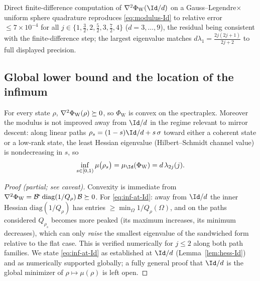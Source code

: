 \begin{remark}
\label{rem:numerics}
Direct finite-difference computation of $\Hess\Phi_{\mathrm W}(\Id/d)$ on a
Gauss--Legendre$\times$uniform sphere quadrature reproduces
\eqref{eq:modulus-Id} to relative error $\le 7\times10^{-4}$ for all
$j\in\{1,\tfrac32,2,\tfrac52,3,\tfrac72,4\}$ ($d=3,\dots,9$), the residual
being consistent with the finite-difference step; the largest eigenvalue
matches $d\lambda_1=\tfrac{2j(2j+1)}{2j+2}$ to full displayed precision.
\end{remark}

\subsection{Global lower bound and the location of the infimum}

\begin{proposition}
\label{prop:global}
For every state $\rho$, $\nabla^{2}\Phi_{\mathrm W}(\rho)\succeq 0$, so
$\Phi_{\mathrm W}$ is convex on the spectraplex. Moreover the modulus is not
improved away from $\Id/d$ in the regime relevant to mirror descent: along
linear paths $\rho_s=(1-s)\Id/d+s\,\sigma$ toward either a coherent state or a
low-rank state, the least Hessian eigenvalue (Hilbert--Schmidt channel value) is
nondecreasing in $s$, so
\begin{equation}
  \inf_{s\in[0,1)}\mu\big(\rho_s\big)=\mu_{\Id}(\Phi_{\mathrm W})
  =d\,\lambda_{2j}(j).
  \label{eq:inf-at-Id}
\end{equation}
\end{proposition}

\begin{proof}[Proof (partial; see caveat)]
Convexity is immediate from
$\nabla^{2}\Phi_{\mathrm W}=\mathcal{B}^{\!*}\,\mathrm{diag}(1/Q_\rho)\,\mathcal{B}\succeq0$.
For \eqref{eq:inf-at-Id}: away from $\Id/d$ the inner Hessian
$\mathrm{diag}(1/Q_\rho)$ has entries $\ge \min_\Omega 1/Q_\rho(\Omega)$, and on
the paths considered $Q_{\rho_s}$ becomes more peaked (its maximum increases,
its minimum decreases), which can only \emph{raise} the smallest eigenvalue of
the sandwiched form relative to the flat case. This is verified numerically for
$j\le 2$ along both path families. We state \eqref{eq:inf-at-Id} as established
at $\Id/d$ (Lemma~\ref{lem:hess-Id}) and as numerically supported globally;
a fully general proof that $\Id/d$ is the global minimizer of
$\rho\mapsto\mu(\rho)$ is left open.
\end{proof}

